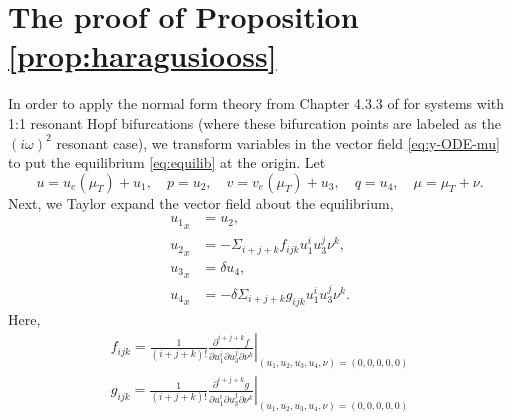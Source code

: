 \documentclass[11pt]{article}
\numberwithin{equation}{section}
\begin{document}
\section{The proof of Proposition \texorpdfstring{\ref{prop:haragusiooss}}{Lg}}\label{app:Turing}

In order to apply the normal form theory from Chapter 4.3.3 of \cite{HI2011} for systems with 1:1 resonant Hopf bifurcations (where these bifurcation points are labeled as the $(i \omega)^2$ resonant case), we transform variables in the vector field \eqref{eq:y-ODE-mu} to put the equilibrium \eqref{eq:equilib} at the origin.
Let
\begin{equation}
u = u_e(\mu_T) + u_1, \quad 
p = u_2, \quad 
v = v _e( \mu _T) + u_3, \quad 
q= u_4, \quad 
\mu = \mu _T + \nu.
\end{equation}
Next, we Taylor expand the vector field about the equilibrium,
\begin{equation}\label{eq:Taylorexpanded}
\begin{split}
{u_1}_x &= u_2, \\
{u_2}_x &= - \Sigma_{i + j + k } f_{ijk} u_1^i u_3^j \nu^k, \\
{u_3}_x &= \delta u_4, \\
{u_4}_x &= -\delta \Sigma_{i+j+k} g_{ijk} u_1^i u_3^j \nu^k.
\end{split}
\end{equation}
%
Here,
\begin{equation*} 
  \begin{split}
      f_{ijk} = \left. \frac{1}{(i+j+k)!} \frac{\partial^{i+j+k} f}{\partial u_1^i \partial u_3^j \partial \nu^k} \right|_{(u_1,u_2,u_3,u_4,\nu)=(0,0,0,0,0)} \\
      g_{ijk} = \left. \frac{1}{(i+j+k)!} \frac{\partial^{i+j+k} g}{\partial u_1^i \partial u_3^j \partial \nu^k} \right|_{(u_1,u_2,u_3,u_4,\nu)=(0,0,0,0,0)}
  \end{split}
\end{equation*}
\end{document}
